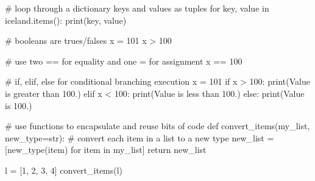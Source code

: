 \documentclass[
  letterpaper,
  DIV=11,
  numbers=noendperiod]{scrreprt}
\newenvironment{Shaded}{\begin{snugshade}}{\end{snugshade}}
\newcommand{\BuiltInTok}[1]{\textcolor[rgb]{0.00,0.23,0.31}{#1}}
\newcommand{\CommentTok}[1]{\textcolor[rgb]{0.37,0.37,0.37}{#1}}
\newcommand{\ControlFlowTok}[1]{\textcolor[rgb]{0.00,0.23,0.31}{#1}}
\newcommand{\DecValTok}[1]{\textcolor[rgb]{0.68,0.00,0.00}{#1}}
\newcommand{\KeywordTok}[1]{\textcolor[rgb]{0.00,0.23,0.31}{#1}}
\newcommand{\NormalTok}[1]{\textcolor[rgb]{0.00,0.23,0.31}{#1}}
\newcommand{\OperatorTok}[1]{\textcolor[rgb]{0.37,0.37,0.37}{#1}}
\newcommand{\StringTok}[1]{\textcolor[rgb]{0.13,0.47,0.30}{#1}}
\begin{document}
\begin{Shaded}
\begin{Highlighting}[]
\CommentTok{\# loop through a dictionary keys and values as tuples}
\ControlFlowTok{for}\NormalTok{ key, value }\KeywordTok{in}\NormalTok{ iceland.items():}
    \BuiltInTok{print}\NormalTok{(key, value)}
\end{Highlighting}
\end{Shaded}

\begin{Shaded}
\begin{Highlighting}[]
\CommentTok{\# booleans are trues/falses}
\NormalTok{x }\OperatorTok{=} \DecValTok{101}
\NormalTok{x }\OperatorTok{\textgreater{}} \DecValTok{100}
\end{Highlighting}
\end{Shaded}

\begin{Shaded}
\begin{Highlighting}[]
\CommentTok{\# use two == for equality and one = for assignment}
\NormalTok{x }\OperatorTok{==} \DecValTok{100}
\end{Highlighting}
\end{Shaded}

\begin{Shaded}
\begin{Highlighting}[]
\CommentTok{\# if, elif, else for conditional branching execution}
\NormalTok{x }\OperatorTok{=} \DecValTok{101}
\ControlFlowTok{if}\NormalTok{ x }\OperatorTok{\textgreater{}} \DecValTok{100}\NormalTok{:}
    \BuiltInTok{print}\NormalTok{(}\StringTok{\textquotesingle{}Value is greater than 100.\textquotesingle{}}\NormalTok{)}
\ControlFlowTok{elif}\NormalTok{ x }\OperatorTok{\textless{}} \DecValTok{100}\NormalTok{:}
    \BuiltInTok{print}\NormalTok{(}\StringTok{\textquotesingle{}Value is less than 100.\textquotesingle{}}\NormalTok{)}
\ControlFlowTok{else}\NormalTok{:}
    \BuiltInTok{print}\NormalTok{(}\StringTok{\textquotesingle{}Value is 100.\textquotesingle{}}\NormalTok{)}
\end{Highlighting}
\end{Shaded}

\begin{Shaded}
\begin{Highlighting}[]
\CommentTok{\# use functions to encapsulate and reuse bits of code}
\KeywordTok{def}\NormalTok{ convert\_items(my\_list, new\_type}\OperatorTok{=}\BuiltInTok{str}\NormalTok{):}
    \CommentTok{\# convert each item in a list to a new type}
\NormalTok{    new\_list }\OperatorTok{=}\NormalTok{ [new\_type(item) }\ControlFlowTok{for}\NormalTok{ item }\KeywordTok{in}\NormalTok{ my\_list]}
    \ControlFlowTok{return}\NormalTok{ new\_list}

\NormalTok{l }\OperatorTok{=}\NormalTok{ [}\DecValTok{1}\NormalTok{, }\DecValTok{2}\NormalTok{, }\DecValTok{3}\NormalTok{, }\DecValTok{4}\NormalTok{]}
\NormalTok{convert\_items(l)}
\end{Highlighting}
\end{Shaded}
\end{document}
